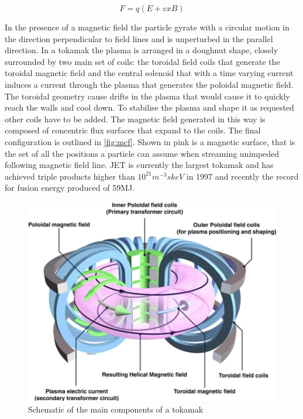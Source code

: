 \begin{equation}
F = q ( E+ vxB )
\label{eq:lorentz}
\end{equation}

In the presence of a magnetic field the particle gyrate with a circular motion in the direction perpendicular to field lines and is unperturbed in the parallel direction. In a tokamak the plasma is arranged in a doughnut shape, closely surrounded by two main set of coils: the toroidal field coils that generate the toroidal magnetic field and the central solenoid that with a time varying current induces a current through the plasma that generates the poloidal magnetic field. The toroidal geometry cause drifts in the plasma that would cause it to quickly reach the walls and cool down. To stabilise the plasma and shape it as requested other coils have to be added.\cite{Chen1974} The magnetic field generated in this way is composed of concentric flux surfaces that expand to the coils. The final configuration is outlined in \autoref{fig:mcf}. Shown in pink is a magnetic surface, that is the set of all the positions a particle can assume when streaming unimpeded following magnetic field line. JET is currently the largest tokamak and has achieved triple products higher than $10^{21} m^{-3}skeV$ in 1997 \cite{Gormezano1998} and recently the record for fusion energy produced of 59MJ. \cite{Gibney2022}

\begin{figure}
	\centering
	\includegraphics[width=\linewidth]{Chapters/chapter1/figs/mcf.png}
	\caption{Schematic of the main components of a tokamak \cite{CulhamCentreforFusionEnergy2018}}
	\label{fig:mcf}
\end{figure}


